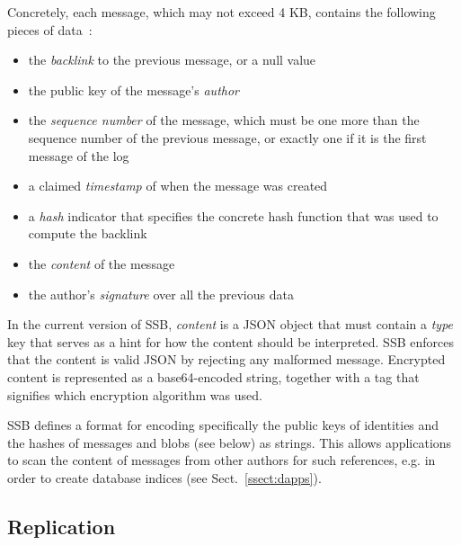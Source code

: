 \documentclass[9pt,sigconf]{acmart}
\begin{document}
Concretely, each message, which may not exceed 4 KB, contains the following pieces of data~\cite{ssb-spec-messages}:

\begin{itemize}

\item the {\em backlink} to the previous message, or a null value

\item the public key of the message's {\em author}

\item the {\em sequence number} of the message, which must be one more than the sequence number of the previous message, or exactly one if it is the first message of the log

\item a claimed {\em timestamp} of when the message was created

\item a {\em hash} indicator that specifies the concrete hash function that was used to compute the backlink

\item the {\em content} of the message

\item the author's {\em signature} over all the previous data

\end{itemize}

In the current version of SSB, {\em content} is a JSON object that must contain a {\em type} key that serves as a hint for how the content should be interpreted. SSB enforces that the content is valid JSON by rejecting any malformed message.
Encrypted content is represented as a base64-encoded string, together with a tag that signifies which encryption algorithm was used.

SSB defines a format for encoding specifically the public keys of identities and the hashes of messages and blobs (see below) as strings. This allows applications to scan the content of messages from other authors for such references, e.g. in order to create database indices (see Sect.~\ref{ssect:dapps}).


\subsection*{Replication}
\end{document}

